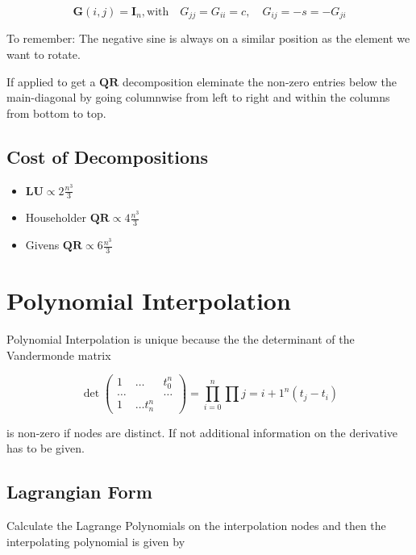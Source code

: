 \documentclass[
    a4paper,
    11pt
]{article}
\begin{document}
\begin{equation}
    \mathbf{G}(i, j) = \mathbf{I}_n, \text{with} \quad
    G_{jj} = G_{ii} = c, \quad G_{ij} = -s = -G_{ji}
\end{equation}

To remember: The negative sine is always on a similar position as the element we
want to rotate.


If applied to get a $\mathbf{QR}$ decomposition eleminate the non-zero entries
below the main-diagonal by going columnwise from left to right and within the
columns from bottom to top.

\subsection{Cost of Decompositions}

\begin{itemize}
    \item $\mathbf{LU} \propto 2\frac{n^3}{3}$
    \item Householder $\mathbf{QR} \propto 4\frac{n^3}{3}$
    \item Givens $\mathbf{QR} \propto 6\frac{n^3}{3}$

\end{itemize}

\section{Polynomial Interpolation}

Polynomial Interpolation is unique because the the determinant of the
Vandermonde matrix

\begin{equation}
    \det \begin{pmatrix}
        1 & \dots & t_0^n \\
        \hdots & & \hdots \\
        1 & \dots t_n^n
        \end{pmatrix}
    =
    \prod_{i=0}^n \prod{j=i+1}^n (t_j -t_i)
\end{equation}

is non-zero if nodes are distinct. If not additional information on the
derivative has to be given.

\subsection{Lagrangian Form}

Calculate the Lagrange Polynomials on the interpolation nodes and then the
interpolating polynomial is given by
\end{document}
